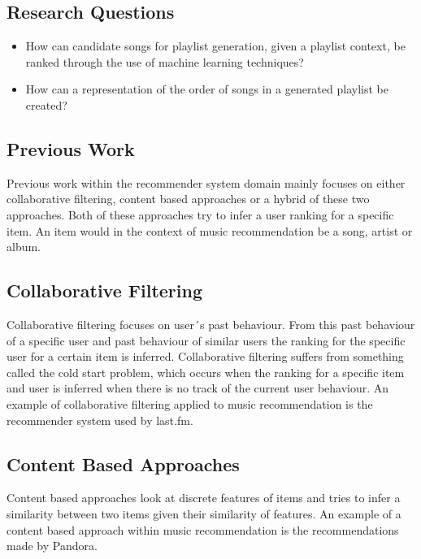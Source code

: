 \documentclass[a4paper,11pt]{kth-mag}
\begin{document}
\subsection{Research Questions}
\begin{itemize}
\item How can candidate songs for playlist generation, given a playlist context, be ranked through the use of machine learning techniques?
\item How can a representation of the order of songs in a generated playlist be created?
\end{itemize}

\subsection{Previous Work}
Previous work within the recommender system domain mainly focuses on either collaborative filtering, content based approaches or a hybrid of these two approaches. Both of these approaches try to infer a user ranking for a specific item. An item would in the context of music recommendation be a song, artist or album.

\subsection{Collaborative Filtering}
Collaborative filtering focuses on user´s past behaviour. From this past behaviour of a specific user and past behaviour of similar users the ranking for the specific user for a certain item is inferred. Collaborative filtering suffers from something called the cold start problem, which occurs when the ranking for a specific item and user is inferred when there is no track of the current user behaviour. An example of collaborative filtering applied to music recommendation is the recommender system used by last.fm.

\subsection{Content Based Approaches}
Content based approaches look at discrete features of items and tries to infer a similarity between two items given their similarity of features. An example of a content based approach within music recommendation is the recommendations made by Pandora.
\end{document}
